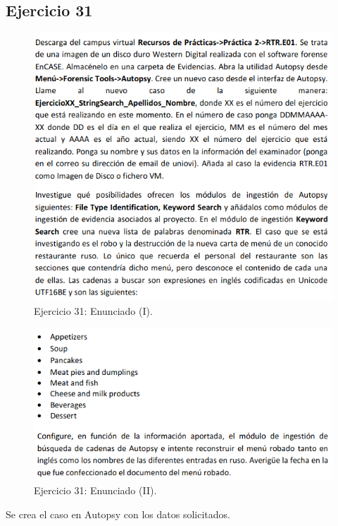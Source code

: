 \documentclass[11pt]{article}
\begin{document}
\subsection{Ejercicio 31}

\begin{figure}[H]
    \caption{Ejercicio 31: Enunciado (I).}
  \centering
  \includegraphics[scale=0.7]{other/enunciado_p02_e31-1.png}
\end{figure}

\begin{figure}[H]
    \caption{Ejercicio 31: Enunciado (II).}
  \centering
  \includegraphics[scale=0.7]{other/enunciado_p02_e31-2.png}
\end{figure}

Se crea el caso en Autopsy con los datos solicitados.
\end{document}

